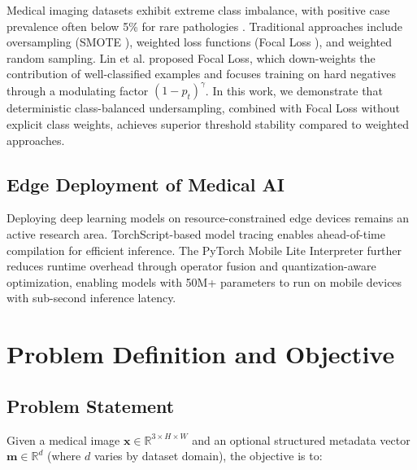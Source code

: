 \documentclass[12pt,a4paper]{report}
\begin{document}
Medical imaging datasets exhibit extreme class imbalance, with positive case prevalence often below 5\% for rare pathologies \cite{johnson2019mimic}. Traditional approaches include oversampling (SMOTE \cite{chawla2002smote}), weighted loss functions (Focal Loss \cite{lin2017focal}), and weighted random sampling. Lin et al. \cite{lin2017focal} proposed Focal Loss, which down-weights the contribution of well-classified examples and focuses training on hard negatives through a modulating factor $(1 - p_t)^\gamma$. In this work, we demonstrate that deterministic class-balanced undersampling, combined with Focal Loss without explicit class weights, achieves superior threshold stability compared to weighted approaches.

\section{Edge Deployment of Medical AI}

Deploying deep learning models on resource-constrained edge devices remains an active research area. TorchScript-based model tracing \cite{pytorch2019} enables ahead-of-time compilation for efficient inference. The PyTorch Mobile Lite Interpreter further reduces runtime overhead through operator fusion and quantization-aware optimization, enabling models with 50M+ parameters to run on mobile devices with sub-second inference latency.


\chapter{Problem Definition and Objective}

\section{Problem Statement}

Given a medical image $\mathbf{x} \in \mathbb{R}^{3 \times H \times W}$ and an optional structured metadata vector $\mathbf{m} \in \mathbb{R}^{d}$ (where $d$ varies by dataset domain), the objective is to:
\end{document}
